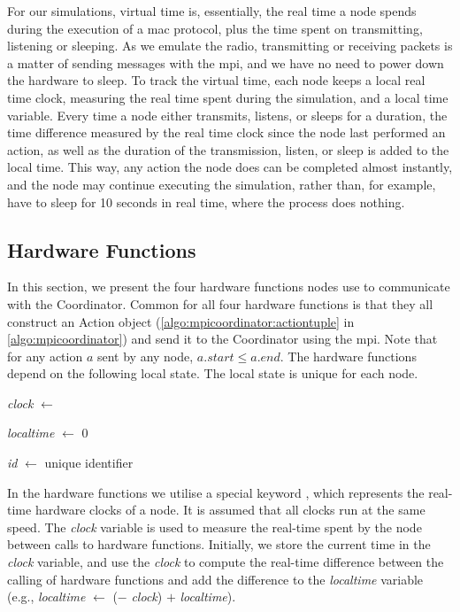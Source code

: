 For our simulations, virtual time is, essentially, the real time a node spends during the execution of a
\gls{mac} protocol, plus the time spent on transmitting, listening or sleeping. As we emulate the radio,
transmitting or receiving packets is a matter of sending messages with the \gls{mpi}, and we have no need to
power down the hardware to sleep. To track the virtual time, each node keeps a local real time clock,
measuring the real time spent during the simulation, and a local time variable. Every time a node either
transmits, listens, or sleeps for a duration, the time difference measured by the real time clock since the
node last performed an action, as well as the duration of the transmission, listen, or sleep is added to the
local time. This way, any action the node does can be completed almost instantly, and the node may continue
executing the simulation, rather than, for example, have to sleep for 10 seconds in real time, where the
process does nothing.

\subsection{Hardware Functions}\label{sec:hwfuncspseudo}
In this section, we present the four hardware functions nodes use to communicate with the Coordinator. Common
for all four hardware functions is that they all construct an Action object
(\autoref{algo:mpicoordinator:actiontuple} in \autoref{algo:mpicoordinator}) and send it to the Coordinator
using the \gls{mpi}. Note that for any action $a$ sent by any node, $a.\mathit{start} \leq a.\mathit{end}$.
The hardware functions depend on the following local state. The local state is unique for each node.
\smallbreak

\textit{clock} $\leftarrow$ \KwNow

\textit{localtime} $\leftarrow$ 0

\textit{id} $\leftarrow$ unique identifier \smallbreak

In the hardware functions we utilise a special keyword \KwNow, which represents the real-time hardware clocks
of a node. It is assumed that all clocks run at the same speed. The \textit{clock} variable is used to measure
the real-time spent by the node between calls to hardware functions. Initially, we store the current time in
the \textit{clock} variable, and use the \textit{clock} to compute the real-time difference between the
calling of hardware functions and add the difference to the \textit{localtime} variable (e.g.,
\textit{localtime} $\leftarrow$ (\KwNow $-$ \textit{clock}) $+$ \textit{localtime}).

